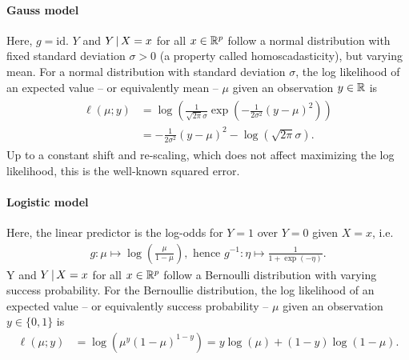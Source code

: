 \paragraph{Gauss model}
Here, $g = \text{id}$. $Y$ and $Y \,|\, X = x$ for all $x \in \mathbb{R}^p$ follow a normal
distribution with fixed standard deviation $\sigma > 0$ (a property called homoscadasticity), but 
varying mean. For a normal distribution with standard deviation $\sigma$, the log likelihood of an 
expected value -- or equivalently mean -- $\mu$ given an observation $y \in \mathbb{R}$ is
\begin{align}
\begin{split}
    \ell(\mu; y) &= \log\left( \frac{1}{\sqrt{2\pi}\sigma} 
        \exp \left( -\frac{1}{2\sigma^2}(y - \mu)^2 \right) \right) \\
    &= -\frac{1}{2\sigma^2}(y - \mu)^2 - \log \left( \sqrt{2\pi}\sigma \right).
\end{split}
\end{align}
Up to a constant shift and re-scaling, which does not affect maximizing the log likelihood, this
is the well-known squared error.

\paragraph{Logistic model}
Here, the linear predictor is the log-odds for $Y = 1$ over $Y = 0$ given $X = x$, i.e.
\begin{align}
    g: \mu \mapsto \log\left( \frac{\mu}{1 - \mu} \right), \text{ hence } g^{-1}: \eta \mapsto
    \frac{1}{1 + \exp(-\eta)}.
\end{align}
Y and $Y \,|\, X = x$ for all $x \in \mathbb{R}^p$ follow a Bernoulli distribution with varying success 
probability. For the Bernoullie distribution, the log likelihood of an expected value -- or 
equivalently success probability -- $\mu$ given an observation $y \in \{0, 1\}$ is
\begin{align}
    \ell(\mu; y) &= \log\left( \mu^{y} (1 - \mu)^{1 - y} \right) 
    = y \log(\mu) + (1 - y) \log(1 - \mu). 
\end{align}

